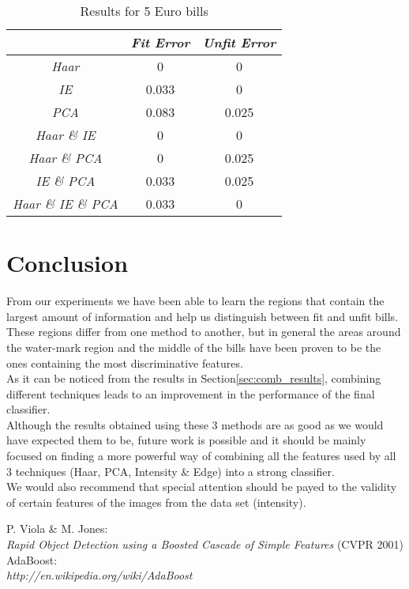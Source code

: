 \documentclass[11pt,twocolumn]{article}
\newcommand{\tit}{\textit}
\begin{document}
		\begin{table}[!htbp]
			\caption{Results for 5 Euro bills}
			\selectfont\small
			\label{table5}
			\centering 
			\begin{tabular}{ | c | c | c|}
				\hline\hline & \emph{Fit Error} & \emph{Unfit Error} \\ [0.5ex]\hline 
				\emph{Haar} & 0 & 0 \\ [0.5ex]\hline
				\emph{IE} & 0.033 & 0 \\ [0.5ex]\hline
				\emph{PCA} & 0.083 & 0.025 \\ [0.5ex]\hline
				\emph{Haar \& IE} & 0 & 0 \\ [0.5ex]\hline
				\emph{Haar \& PCA} & 0 & 0.025 \\ [0.5ex]\hline
				\emph{IE \& PCA} & 0.033 & 0.025 \\ [0.5ex]\hline
				\emph{Haar \& IE \& PCA} & 0.033 & 0 \\ [0.5ex]\hline
			\end{tabular}
			\label{table:nonlin} 
		\end{table}		  	
	\section{Conclusion}\label{sec:conclusion}
		\hspace*{10px}From our experiments we have been able to learn the regions that contain the largest amount of information and help us distinguish between fit and unfit bills. These regions differ from one method to another, but in general the areas around the water-mark region and the middle of the bills have been proven to be the ones containing the most discriminative features.\\
		\hspace*{10px}As it can be noticed from the results in Section\ref{sec:comb_results}, combining different techniques leads to an improvement in the performance of the final classifier.\\
		\hspace*{10px}Although the results obtained using these 3 methods are as good as we would have expected them to be, future work is possible and it should be mainly focused on finding a more powerful way of combining all the features used by all 3 techniques (Haar, PCA, Intensity \& Edge) into a strong classifier.\\
		\hspace*{10px}We would also recommend that special attention should be payed to the validity of certain features of the images from the data set (intensity).\\  
	\begin{thebibliography}{2}
			P. Viola \& M. Jones:\\
			\tit{Rapid Object Detection using a Boosted Cascade of Simple Features}
			(CVPR 2001)
			AdaBoost: \\
			\tit{http://en.wikipedia.org/wiki/AdaBoost}	
	\end{thebibliography}
\end{document}
